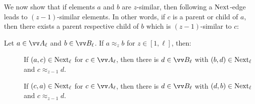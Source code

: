 We now show that if elements $a$ and $b$ are $z$-similar, then following a $\mathrm{Next}$-edge leads to $(z-1)$-similar elements.
In other words, if $c$ is a parent or child of $a$, then there exists a parent respective child of $b$ which is $(z-1)$-similar to $c$:
\begin{lemma}\label{lem:approx-next}
  Let $a \in \unraveldom{A}_{\ell}$ and $b \in \unraveldom{B}_{\ell}$. If $a \approx_{z} b$ for $z \in [1,\ell]$, then:
  \begin{description}
  \item[] If $(a, c) \in \mathrm{Next}_{\ell}$ for $c \in \unraveldom{A}_{\ell}$, then there is $d \in \unraveldom{B}_{\ell}$ with $(b, d) \in \mathrm{Next}_{\ell}$ and $c \approx_{z-1} d$.
  \item[] If $(c, a) \in \mathrm{Next}_{\ell}$ for $c \in \unraveldom{A}_{\ell}$, then there is $d \in \unraveldom{B}_{\ell}$ with $(d, b) \in \mathrm{Next}_{\ell}$ and $c \approx_{z-1} d$.
\end{description}
\end{lemma}
